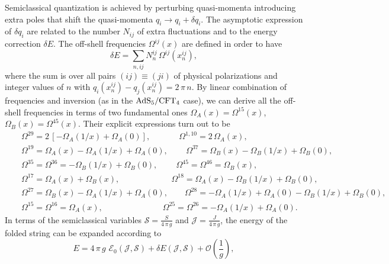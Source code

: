 Semiclassical quantization is achieved by perturbing quasi-momenta introducing extra poles that shift the quasi-momenta
$q_{i}\to q_{i}+\delta q_{i}$.
The asymptotic expression of $\delta q_{i}$ are related to the number $N_{ij}$ of extra fluctuations and to the energy correction $\delta E$.
The off-shell frequencies $\Omega^{ij}(x)$ are defined in order to have %
\begin{equation}
\delta E = \sum_{n, ij} N^{ij}_{n}\,\Omega^{ij}(x^{ij}_{n}),
\end{equation}
where the sum is over all pairs $(ij)\equiv (ji)$ of physical polarizations and integer values of $n$ with $q_{i}(x^{ij}_{n})-q_{j}(x^{ij}_{n}) = 2\,\pi\,n$.
By linear combination of frequencies and inversion (as in the ${\rm AdS}_{5}/{\rm CFT}_{4}$ case), we can derive all  the off-shell frequencies in terms of two fundamental ones $\Omega_{A}(x) = \Omega^{15}(x)$, $\Omega_{B}(x) = \Omega^{45}(x)$.
Their explicit expressions turn out to be 
\begin{eqnarray}
&& \Omega^{29} =  2\,\left[-\Omega_{A}(1/x)+\Omega_{A}(0)\right], \nonumber \qquad \quad\ \ 
\Omega^{1, 10} =  2\,\Omega_{A}(x),\nonumber \\
&& \Omega^{19} =  \Omega_{A}(x)-\Omega_{A}(1/x)+\Omega_{A}(0), \nonumber \qquad \,
\Omega^{37} =\Omega_{B}(x)-\Omega_{B}(1/x)+\Omega_{B}(0), \nonumber \\
&& \Omega^{35}  = \Omega^{36} = -\Omega_{B}(1/x)+\Omega_{B}(0),\nonumber \qquad \ 
\Omega^{45} = \Omega^{46} = \Omega_{B}(x), \nonumber \\
&&\Omega^{17} = \Omega_{A}(x)+\Omega_{B}(x), \nonumber \qquad \qquad \qquad \ 
\Omega^{18} = \Omega_{A}(x)-\Omega_{B}(1/x)+\Omega_{B}(0), \nonumber \\
&& \Omega^{27} = \Omega_{B}(x)-\Omega_{A}(1/x)+\Omega_{A}(0), \nonumber \qquad
\Omega^{28} = -\Omega_{A}(1/x)+\Omega_{A}(0)-\Omega_{B}(1/x)+\Omega_{B}(0), \nonumber \\
&& \Omega^{15} = \Omega^{16} = \Omega_{A}(x), \nonumber \qquad \qquad \qquad \quad \ 
\Omega^{25} = \Omega^{26} = -\Omega_{A}(1/x)+\Omega_{A}(0).
\end{eqnarray}
In terms of the semiclassical variables $\mathcal S = \frac{S}{4\,\pi\,g}$ and $\mathcal J = \frac{J}{4\,\pi\,g}$, the energy of the folded string can be expanded according to 
\begin{equation}
E = 4\,\pi\,g\,\,\mathcal E_{0}(\mathcal J, \mathcal S)+\delta E(\mathcal J, \mathcal S)+\mathcal O\left(\frac{1}{g}\right),
\end{equation}

